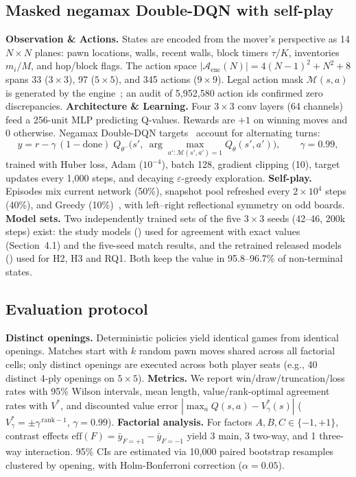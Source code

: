 \documentclass[10pt]{article}
\begin{document}
\subsection{Masked negamax Double-DQN with self-play}
\textbf{Observation \& Actions.} States are encoded from the mover's perspective as 14 $N\times N$ planes: pawn locations, walls, recent walls, block timers $\tau/K$, inventories $m_i/M$, and hop/block flags. The action space $|\mathcal{A}_{\text{enc}}(N)|=4(N-1)^2+N^2+8$ spans 33 ($3\times3$), 97 ($5\times5$), and 345 actions ($9\times9$). Legal action mask $\mathcal{M}(s,a)$ is generated by the engine~\cite{huang2022}; an audit of 5{,}952{,}580 action ids confirmed zero discrepancies. \textbf{Architecture \& Learning.} Four $3\times3$ conv layers (64 channels) feed a 256-unit MLP predicting Q-values. Rewards are $+1$ on winning moves and 0 otherwise. Negamax Double-DQN targets~\cite{mnih2015,vanhasselt2016} account for alternating turns:
\begin{equation}
y=r-\gamma\,(1-\mathrm{done})\;Q_{\theta^-}\!\Big(s',\ \arg\max_{a':\mathcal{M}(s',a')=1} Q_\theta(s',a')\Big),\qquad \gamma=0.99,
\end{equation}
trained with Huber loss, Adam ($10^{-4}$), batch 128, gradient clipping (10), target updates every 1{,}000 steps, and decaying $\varepsilon$-greedy exploration. \textbf{Self-play.} Episodes mix current network (50\%), snapshot pool refreshed every $2\times10^4$ steps (40\%), and Greedy (10\%)~\cite{silver2018}, with left--right reflectional symmetry on odd boards. \textbf{Model sets.} Two independently trained sets of the five $3\times3$ seeds (42--46, 200k steps) exist: the study models () used for agreement with exact values (Section~4.1) and the five-seed match results, and the retrained released models () used for H2, H3 and RQ1. Both keep the value in 95.8--96.7\% of non-terminal states.

\subsection{Evaluation protocol}\label{sec:protocol}
\textbf{Distinct openings.} Deterministic policies yield identical games from identical openings. Matches start with $k$ random pawn moves shared across all factorial cells; only distinct openings are executed across both player seats (e.g., 40 distinct 4-ply openings on $5\times5$).
\textbf{Metrics.} We report win/draw/truncation/loss rates with 95\% Wilson intervals, mean length, value/rank-optimal agreement rates with $V^*$, and discounted value error $|\max_a Q(s,a)-V^*_\gamma(s)|$ ($V^*_\gamma=\pm\gamma^{\,\mathrm{rank}-1}$, $\gamma=0.99$).
\textbf{Factorial analysis.} For factors $A,B,C\in\{-1,+1\}$, contrast effects $\mathrm{eff}(F)=\bar y_{F=+1}-\bar y_{F=-1}$ yield 3 main, 3 two-way, and 1 three-way interaction. 95\% CIs are estimated via 10{,}000 paired bootstrap resamples clustered by opening, with Holm-Bonferroni correction ($\alpha=0.05$).
\end{document}
